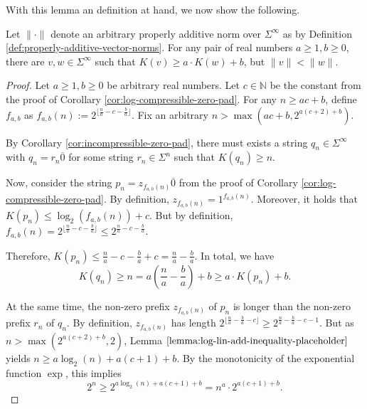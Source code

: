 With this lemma an definition at hand, we now show the following.
\begin{theorem}
	Let $\lVert\cdot\rVert$ denote an arbitrary properly additive norm over $\Sigma^{\infty}$ as by Definition \ref{def:properly-additive-vector-norms}.
	For any pair of real numbers $a\geq 1, b\geq 0$, there are $v,w\in\Sigma^{\infty}$ such that $K(v)\geq a\cdot K(w)+b$, but $\lVert v \rVert < \lVert w \rVert $. 
\end{theorem}
\begin{proof}
	Let $a\geq 1, b\geq 0$ be arbitrary real numbers.
	Let $c\in\mathbb{N}$ be the constant from the proof of Corollary \ref{cor:log-compressible-zero-pad}.
	For any $n\geq ac+b$, define $f_{a,b}$ as $f_{a,b}(n):=2^{\lfloor \frac{n}{a}-c-\frac{b}{a}\rfloor}$.
	Fix an arbitrary $n> \max(ac+b,2^{a(c+2)+b})$.
	
	By Corollary \ref{cor:incompressible-zero-pad}, there must exists a string $q_n\in\Sigma^{\infty}$ with $q_n=r_n\overline{0}$ for some string $r_n\in\Sigma^n$ such that $K(q_n)\geq n$. 
	
	Now, consider the string $p_{n}=z_{f_{a,b}(n)}\overline{0}$ from the proof of Corollary \ref{cor:log-compressible-zero-pad}.
	By definition, $z_{f_{a,b}(n)}=1^{f_{a,b}(n)}$.
	Moreover, it holds that $K(p_{n})\leq \log_2(f_{a,b}(n))+c$.
	But by definition, $f_{a,b}(n)= 2^{\lfloor \frac{n}{a}-c-\frac{b}{a}\rfloor}\leq 2^{\frac{n}{a}-c-\frac{b}{a}}$.
	
	Therefore, $K(p_n)\leq \frac{n}{a}-c-\frac{b}{a}+c=\frac{n}{a}-\frac{b}{a}$.
	In total, we have 
	\begin{equation}
		K(q_n)\geq n = a\left(\frac{n}{a}-\frac{b}{a}\right)+b\geq a\cdot K(p_n)+b.
	\end{equation}
	
	At the same time, the non-zero prefix $z_{f_{a,b}(n)}$ of $p_n$ is longer than the non-zero prefix $r_n$ of $q_n$.
	By definition, $z_{f_{a,b}(n)}$ has length $2^{\lfloor \frac{n}{a}-\frac{b}{a}-c\rfloor}\geq 2^{ \frac{n}{a}-\frac{b}{a}-c-1}$.
	But as $n>\max(2^{a(c+2)+b},2)$, Lemma $\ref{lemma:log-lin-add-inequality-placeholder}$ yields
	$n\geq a\log_2(n)+a(c+1)+b$. By the monotonicity of the exponential function $\exp$, this implies
	\begin{equation}
		2^{n}\geq 2^{a\log_2(n)+a(c+1)+b}=n^a \cdot 2^{a(c+1)+b}.
	\end{equation}
	

\end{proof}
